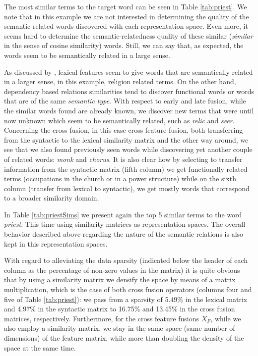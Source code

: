 The  most similar terms to the target word can be seen in Table \ref{tab:priest}. We note that in this example we are not interested in determining the quality of the semantic related words discovered with each representation space. Even more, it seems hard to determine the semantic-relatedness quality of these similar (\textit{similar} in the sense of cosine similarity) words. Still, we can say that, as expected, the words seem to be semantically related in a large sense.

As discussed by \cite{LevyG14}, lexical features seem to give words that are semantically related in a larger sense, in this example, religion related terms. On the other hand, dependency based relations similarities tend to discover functional words or words that are of the same \textit{semantic type}.
With respect to early and late fusion, while the similar words found are already known, we discover new terms that were until now unknown which seem to be semantically related, such as \textit{relic} and \textit{seer}. Concerning the cross fusion, in this case cross feature fusion, both transferring from the syntactic to the lexical similarity matrix and the other way around, we see that we also found previously seen words while discovering yet another couple of related words: \textit{monk} and \textit{chorus}. It is also clear how by selecting to transfer information from the syntactic matrix (fifth column) we get functionally related terms (occupations in the church or in a power structure) while on the sixth column (transfer from lexical to syntactic), we get mostly words that correspond to a broader similarity domain.

In Table \ref{tab:priestSims} we present again the top 5 similar terms to the word \textit{priest}.  This time using similarity matrices as representation spaces. The overall behavior described above regarding the nature of the semantic relations is also kept in this representation spaces.

With regard to alleviating the data sparsity (indicated below the header of each column as the percentage of non-zero values in the matrix) it is quite obvious that by using a similarity matrix we densify the space by means of a matrix multiplication, which is the case of both cross fusion operators (columns four and five of Table \ref{tab:priest}): we pass from a sparsity of {5.49}\% in the lexical matrix and {4.97}\% in the syntactic matrix to  {16.75}\% and {13.45}\% in the cross fusion matrices, respectively. 
%
Furthermore, for the cross feature fusions $X_F$, while we also employ a similarity matrix, we stay in the same space (same number of dimensions) of the feature matrix, while more than doubling the density of the space at the same time. 


